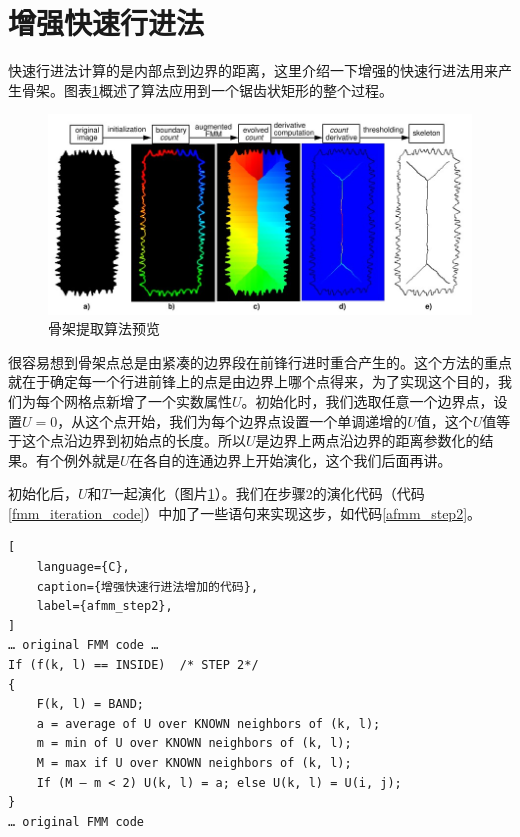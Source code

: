\section{增强快速行进法}
快速行进法计算的是内部点到边界的距离，这里介绍一下增强的快速行进法用来产生骨架。图表\ref{skel_overview}概述了算法应用到一个锯齿状矩形的整个过程。
\begin{figure}[h!]
    \centering
    \includegraphics[height=200bp]{figure/skel_overview.png}
    \caption{骨架提取算法预览}
    \label{skel_overview}
\end{figure}
很容易想到骨架点总是由紧凑的边界段在前锋行进时重合产生的。这个方法的重点就在于确定每一个行进前锋上的点是由边界上哪个点得来，为了实现这个目的，我们为每个网格点新增了一个实数属性$U$。初始化时，我们选取任意一个边界点，设置$U=0$，从这个点开始，我们为每个边界点设置一个单调递增的$U$值，这个$U$值等于这个点沿边界到初始点的长度。所以$U$是边界上两点沿边界的距离参数化的结果。有个例外就是$U$在各自的连通边界上开始演化，这个我们后面再讲。

初始化后，$U$和$T$一起演化（图片\ref{skel_overview}）。我们在步骤2的演化代码（代码\ref{fmm_iteration_code}）中加了一些语句来实现这步，如代码\ref{afmm_step2}。
\begin{lstlisting}[
    language={C},
    caption={增强快速行进法增加的代码},
    label={afmm_step2},
]
… original FMM code …
If (f(k, l) == INSIDE)	/* STEP 2*/
{
	F(k, l) = BAND;
	a = average of U over KNOWN neighbors of (k, l);
	m = min of U over KNOWN neighbors of (k, l);
	M = max if U over KNOWN neighbors of (k, l);
	If (M – m < 2) U(k, l) = a; else U(k, l) = U(i, j);
}
… original FMM code
\end{lstlisting}

